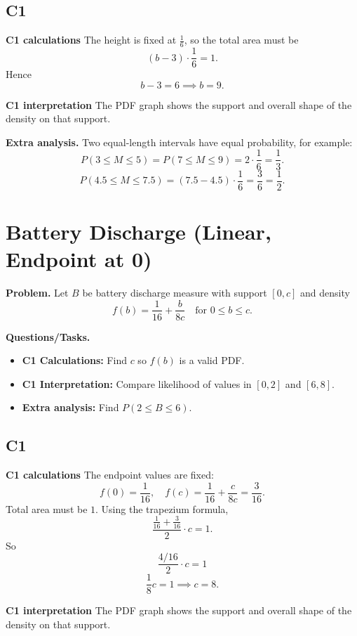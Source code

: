 	\subsection*{C1}
	
	\textbf{C1 calculations}
	The height is fixed at $\frac16$, so the total area must be
	\[
	(b-3)\cdot \frac16=1.
	\]
	Hence
	\[
	b-3=6\implies b=9.
	\]
	
	\textbf{C1 interpretation}
	The PDF graph shows the support and overall shape of the density on that support.
	
	\textbf{Extra analysis.}
	Two equal-length intervals have equal probability, for example:
	\[
	P(3\le M\le5)=P(7\le M\le9)=2\cdot\frac16=\frac13.
	\]
	\[
	P(4.5\le M\le7.5)=(7.5-4.5)\cdot\frac16=\frac{3}{6}=\frac12.
	\]

	
\section{Battery Discharge (Linear, Endpoint at 0)}

\textbf{Problem.}
Let $B$ be battery discharge measure with support $[0,c]$ and density
\[
f(b)=\frac{1}{16}+\frac{b}{8c}\quad\text{for }0\le b\le c.
\]

\textbf{Questions/Tasks.}
\begin{itemize}
	\item \textbf{C1 Calculations:} Find $c$ so $f(b)$ is a valid PDF.
	\item \textbf{C1 Interpretation:} Compare likelihood of values in $[0,2]$ and $[6,8]$.
	\item \textbf{Extra analysis:} Find $P(2\le B\le 6)$.
\end{itemize}

\subsection*{C1}

\textbf{C1 calculations}
The endpoint values are fixed:
\[
f(0)=\frac{1}{16},\quad f(c)=\frac{1}{16}+\frac{c}{8c}=\frac{3}{16}.
\]
Total area must be $1$. Using the trapezium formula,
\[
\frac{\frac{1}{16}+\frac{3}{16}}{2}\cdot c=1.
\]
So
\[
\frac{4/16}{2}\cdot c=1
\]
	\[
	\frac{1}{8}c=1\implies c=8.
	\]

\textbf{C1 interpretation}
The PDF graph shows the support and overall shape of the density on that support.

